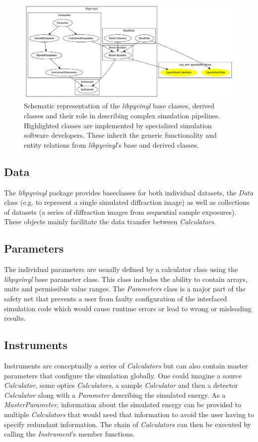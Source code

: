 \documentclass[10pt]{scrartcl}
\begin{document}
\begin{figure}[ht]
  \centering
  \includegraphics[width=.8\textwidth]{figures/libpyvinyl_classes_relations.png}
  \caption[\textit{libpyvinyl} schema]{Schematic representation of the
    \textit{libpyvinyl} base classes, derived classes and their role in
    describing complex simulation pipelines. Highlighted classes are implemented
  by specialized simulation software developers. These inherit the generic
  functionality and entity relations from \textit{libpyvinyl}'s base and derived classes.}
  \label{fig:libpyvinyl_classes_schema}
\end{figure}

\subsection{Data}
\label{sec:data}
The \textit{libpyvinyl} package provides baseclasses for both individual
datasets, the \textit{Data} class (e.g. to represent a single simulated diffraction image)
as well as  collections of datasets (a series of diffraction images from
 sequential sample exposures). These objects  mainly facilitate the data transfer between \textit{Calculators}.

\subsection{Parameters}
\label{sec:parameters}
The individual parameters are usually defined by a calculator class using the
\textit{libpyvinyl} base parameter class. This class includes the ability to
contain arrays, units and permissible value ranges. The \textit{Parameters}
class is a major part of the safety net that prevents a user from faulty
configuration of the interfaced simulation code which would cause runtime
errors or lead to wrong or misleading results.

\subsection{Instruments}
\label{sec:instruments}
Instruments are conceptually a series of \textit{Calculators} but can also contain 
master parameters that configure the simulation globally.
One could imagine a source \textit{Calculator}, some optics
\textit{Calculators}, a sample \textit{Calculator} and then a detector \textit{Calculator} along with a
\textit{Parameter} describing the simulated energy. As a \textit{MasterParameter}, information
about the simulated energy can be provided to multiple \textit{Calculators} that would
need that information to avoid the user having to specify redundant information.
The chain of \textit{Calculators} can then be executed by calling the
\textit{Instrument}'s member functions.
\end{document}
